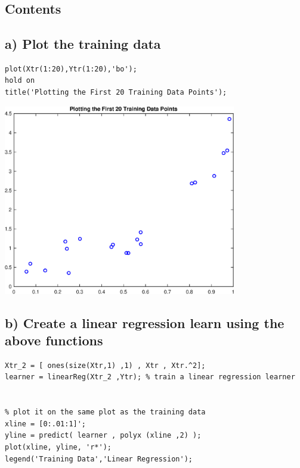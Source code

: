 \documentclass{article}
\begin{document}
    
    
\section*{}


\subsection*{Contents}

\subsection*{a) Plot the training data}

\begin{verbatim}
plot(Xtr(1:20),Ytr(1:20),'bo');
hold on
title('Plotting the First 20 Training Data Points');
\end{verbatim}

\includegraphics [width=4in]{practice1_01.eps}


\subsection*{b) Create a linear regression learn using the above functions}

\begin{verbatim}
Xtr_2 = [ ones(size(Xtr,1) ,1) , Xtr , Xtr.^2];
learner = linearReg(Xtr_2 ,Ytr); % train a linear regression learner


% plot it on the same plot as the training data
xline = [0:.01:1]';
yline = predict( learner , polyx (xline ,2) );
plot(xline, yline, 'r*');
legend('Training Data','Linear Regression');
\end{verbatim}
\end{document}
